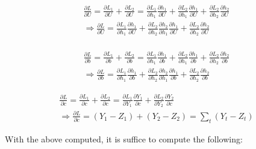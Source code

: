 \begin{example}
\begin{align*}
\frac{\partial L}{\partial U}=\frac{\partial L_1}{\partial U}+\frac{\partial L_2}{\partial U}=\frac{\partial L_1}{\partial h_1}\frac{\partial h_1}{\partial U}+\frac{\partial L_2}{\partial h_1}\frac{\partial h_1}{\partial U}+\frac{\partial L_2}{\partial h_2}\frac{\partial h_2}{\partial U}\\
\Rightarrow \frac{\partial L}{\partial U}=\frac{\partial L_1}{\partial h_1}\frac{\partial h_1}{\partial U}+\frac{\partial L_2}{\partial h_2}\frac{\partial h_2}{\partial h_1}\frac{\partial h_1}{\partial U}+\frac{\partial L_2}{\partial h_2}\frac{\partial h_2}{\partial U}\\
\end{align*}

\begin{align*}
\frac{\partial L}{\partial b}=\frac{\partial L_1}{\partial b}+\frac{\partial L_2}{\partial b}=\frac{\partial L_1}{\partial h_1}\frac{\partial h_1}{\partial b}+\frac{\partial L_2}{\partial h_1}\frac{\partial h_1}{\partial b}+\frac{\partial L_2}{\partial h_2}\frac{\partial h_2}{\partial b}\\
\Rightarrow \frac{\partial L}{\partial b}= \frac{\partial L_1}{\partial h_1}\frac{\partial h_1}{\partial b}+\frac{\partial L_2}{\partial h_2}\frac{\partial h_2}{\partial h_1}\frac{\partial h_1}{\partial b}+\frac{\partial L_2}{\partial h_2}\frac{\partial h_2}{\partial b}
\end{align*}

\begin{align*}
\frac{\partial L}{\partial c}=\frac{\partial L_1}{\partial c}+\frac{\partial L_2}{\partial c}=\frac{\partial L_1}{\partial Y_1}\frac{\partial Y_1}{\partial c}+\frac{\partial L_2}{\partial Y_2}\frac{\partial Y_2}{\partial c}\\
\Rightarrow \frac{\partial L}{\partial c}=(Y_1-Z_1)+(Y_2-Z_2)=\sum_{t}(Y_t-Z_t)
\end{align*}



With the above computed, it is suffice to compute the following:


\end{example}
